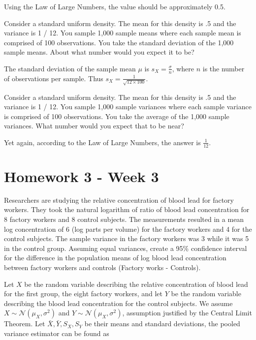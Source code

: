\documentclass{homework}
\begin{document}
Using the Law of Large Numbers, the value should be approximately 0.5.

\begin{tcolorbox}[title=Question 15]
Consider a standard uniform density. The mean for this density is .5 and the variance is 1 / 12. You sample 1,000 sample means where each sample mean is comprised of 100 observations. You take the standard deviation of the 1,000 sample means. About what number would you expect it to be?
\end{tcolorbox}

The standard deviation of the sample mean $\mu$
is $s_{X} = \frac{\sigma}{n}$, where $n$ is the number of observations per sample. Thus $s_X = \frac{1}{\sqrt{12 \times 100}}$.

\begin{tcolorbox}[title=Question 16]
Consider a standard uniform density. The mean for this density is .5 and the variance is 1 / 12. You sample 1,000 sample variances where each sample variance is comprised of 100 observations. You take the average of the 1,000 sample variances. What number would you expect that to be near?
\end{tcolorbox}

Yet again, according to the Law of Large Numbers, the answer is $\frac{1}{12}$.

\section{Homework 3 - Week 3}

\begin{tcolorbox}[title=Question 1]
Researchers are studying the relative concentration of blood lead for factory workers. They took the natural logarithm of ratio of blood lead concentration for 8 factory workers and 8 control subjects. The measurements resulted in a mean log concentration of 6 (log parts per volume) for the factory workers and 4 for the control subjects. The sample variance in the factory workers was 3 while it was 5 in the control group. Assuming equal variances, create a 95\% confidence interval for the difference in the population means of log blood lead concentration between factory workers and controls (Factory works - Controls).
\end{tcolorbox}

Let $X$ be the random variable describing the relative concentration of blood lead for the first group, the eight factory workers, and let $Y$ be the random variable describing the blood lead concentration for the control subjects. We assume $X \sim \mathcal{N}(\mu_X, \sigma^2)$ and $Y \sim \mathcal{N}(\mu_X, \sigma^2)$, assumption justified by the Central Limit Theorem. Let $\bar X, \bar Y, S_X, S_Y$ be their means and standard deviations, the pooled variance estimator can be found as
\end{document}

